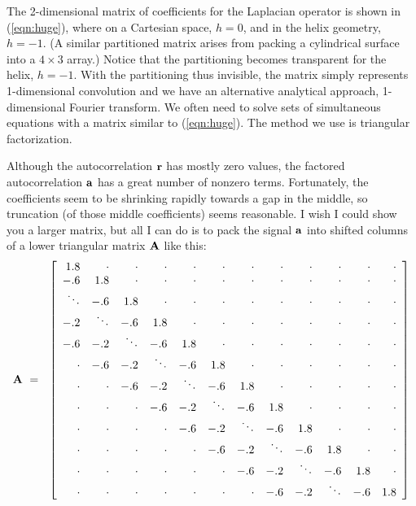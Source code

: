 The 2-dimensional matrix of coefficients for the Laplacian operator
is shown in (\ref{eqn:huge}),
where 
on a Cartesian space, $h=0$,
and in the helix geometry, $h=-1$.
(A similar partitioned matrix arises from packing
a cylindrical surface into a $4\times3$ array.)
Notice that the partitioning becomes transparent for the helix, $h=-1$.
With the partitioning thus invisible, the matrix
simply represents 1-dimensional convolution
and we have an alternative analytical approach,
1-dimensional Fourier transform.
We often need to solve sets of simultaneous equations
with a matrix similar to (\ref{eqn:huge}).
The method we use is triangular factorization.
\par
Although the autocorrelation $\bold r$ has mostly zero values,
the factored autocorrelation $\bold a$ has a great number of nonzero terms.
Fortunately, 
the coefficients seem to be shrinking rapidly towards a gap in the middle,
so truncation (of those middle coefficients) seems reasonable.
I wish I could show you a larger matrix, but all I can do is to pack
the signal $\bold a$ into shifted columns of
a lower triangular matrix $\bold A$ like this:
\begin{equation}
\bold A \ = \ \ 
\left[
\begin{array}{rrrrrrrrrrrr}
   1.8& \cdot& \cdot& \cdot& \cdot& \cdot& \cdot& \cdot& \cdot& \cdot& \cdot& \cdot\\
   -.6&   1.8& \cdot& \cdot& \cdot& \cdot& \cdot& \cdot& \cdot& \cdot& \cdot& \cdot\\
\ddots&   -.6&   1.8& \cdot& \cdot& \cdot& \cdot& \cdot& \cdot& \cdot& \cdot& \cdot\\
   -.2&\ddots&   -.6&   1.8& \cdot& \cdot& \cdot& \cdot& \cdot& \cdot& \cdot& \cdot\\
   -.6&   -.2&\ddots&   -.6&   1.8& \cdot& \cdot& \cdot& \cdot& \cdot& \cdot& \cdot\\
 \cdot&   -.6&   -.2&\ddots&   -.6&   1.8& \cdot& \cdot& \cdot& \cdot& \cdot& \cdot\\
 \cdot& \cdot&   -.6&   -.2&  \ddots& -.6&   1.8& \cdot& \cdot& \cdot& \cdot& \cdot\\
 \cdot& \cdot& \cdot&   -.6&  -.2& \ddots&   -.6&   1.8& \cdot& \cdot& \cdot& \cdot\\
 \cdot& \cdot& \cdot& \cdot&  -.6&    -.2&\ddots&   -.6&   1.8& \cdot& \cdot& \cdot\\
 \cdot& \cdot& \cdot& \cdot& \cdot&   -.6&   -.2&\ddots&   -.6&   1.8& \cdot& \cdot\\
 \cdot& \cdot& \cdot& \cdot& \cdot& \cdot&   -.6&   -.2&\ddots&   -.6&   1.8& \cdot\\
 \cdot& \cdot& \cdot& \cdot& \cdot& \cdot& \cdot&   -.6&   -.2&\ddots&   -.6&  1.8
\end{array}
\right]
\label{eqn:lapfacmat}
\end{equation}
